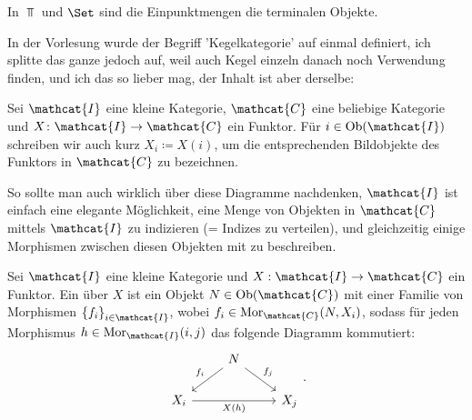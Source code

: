 \begin{example}
    In $\Top$ und  $\Set$ sind die Einpunktmengen die terminalen Objekte.
\end{example}

\begin{remark*}
    In der Vorlesung wurde der Begriff 'Kegelkategorie' auf einmal definiert, ich splitte das ganze jedoch auf, weil auch Kegel einzeln danach noch Verwendung finden, und ich das so lieber mag, der Inhalt ist aber derselbe:
\end{remark*}

\begin{dabuse}
    Sei $\mathcat{I}$ eine kleine Kategorie, $\mathcat{C}$ eine beliebige Kategorie und $X\colon  \mathcat{I} \to  \mathcat{C}$ ein Funktor. Für $i\in \Ob(\mathcat{I})$ schreiben wir auch kurz $X_i \coloneqq  X(i)$, um die entsprechenden Bildobjekte des Funktors in $\mathcat{C}$ zu bezeichnen.
\end{dabuse}

\begin{remark*}
    So sollte man auch wirklich über diese Diagramme nachdenken, $\mathcat{I}$ ist einfach eine elegante Möglichkeit, eine Menge von Objekten in $\mathcat{C}$ mittels $\mathcat{I}$ zu indizieren (= Indizes zu verteilen), und gleichzeitig einige Morphismen zwischen diesen Objekten mit zu beschreiben.
\end{remark*}

\begin{definition**}[Kegel]\label{def:kegel}
    Sei $\mathcat{I}$ eine kleine Kategorie und $X: \mathcat{I} \to  \mathcat{C}$ ein Funktor. Ein  über $X$ ist ein Objekt $N\in \Ob(\mathcat{C})$ mit einer Familie von Morphismen $\left \{f_i\right\} _{i\in \mathcat{I}}$, wobei $f_i \in  \Mor_{\mathcat{C}}(N, X_i)$, sodass für jeden Morphismus $h\in \Mor_{\mathcat{I}}(i,j)$ das folgende Diagramm kommutiert:
    \[
    \begin{tikzcd}
        & N \ar[swap]{dl}{f_i} \ar{dr}{f_j} \\
        X_i \ar[swap]{rr}{X(h)} & & X_j
    \end{tikzcd}
    .\] 
\end{definition**}

